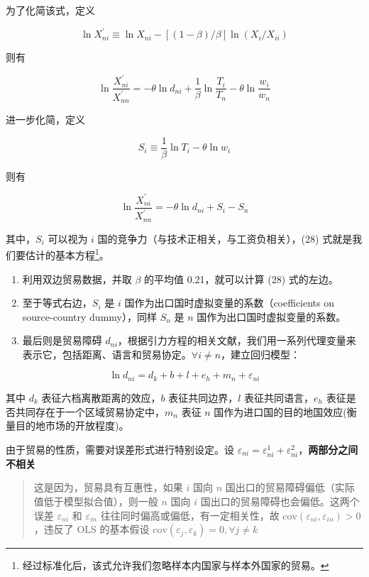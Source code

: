 \documentclass[
]{article}
\providecommand{\tightlist}{%
  \setlength{\itemsep}{0pt}\setlength{\parskip}{0pt}}
\begin{document}
为了化简该式，定义

\[\ln X_{n i}^{\prime} \equiv \ln X_{ni}-[(1-\beta)/\beta] \ln (X_i/X_{ii})\]

则有

\[
\ln \frac{X_{n i}^{\prime}}{X_{n n}^{\prime}}=-\theta \ln d_{n i}+\frac{1}{\beta} \ln \frac{T_{i}}{T_{n}}-\theta \ln \frac{w_{i}}{w_{n}} \tag{26}
\]

进一步化简，定义

\[
S_i \equiv \frac{1}{\beta} \ln T_i - \theta \ln w_i \tag{27}
\]

则有

\[
\ln \frac{X_{n i}^{\prime}}{X_{n n}^{\prime}}=-\theta \ln d_{n i}+S_i-S_n \tag{28}
\]

其中，\(S_i\) 可以视为 \(i\) 国的竞争力（与技术正相关，与工资负相关），(28) 式就是我们要估计的基本方程\footnote{经过标准化后，该式允许我们忽略样本内国家与样本外国家的贸易。}。

\begin{enumerate}
\def\labelenumi{\arabic{enumi}.}
\tightlist
\item
  利用双边贸易数据，并取 \(\beta\) 的平均值 0.21，就可以计算 (28) 式的左边。
\item
  至于等式右边，\(S_i\) 是 \(i\) 国作为出口国时虚拟变量的系数（coefficients on source-country dummy），同样 \(S_n\) 是 \(n\) 国作为出口国时虚拟变量的系数。
\item
  最后则是贸易障碍 \(d_{ni}\)，根据引力方程的相关文献，我们用一系列代理变量来表示它，包括距离、语言和贸易协定。\(\forall i \neq n\)，建立回归模型：
\end{enumerate}

\[
\ln d_{n i}=d_{k}+b+l+e_{h}+m_{n}+\varepsilon_{n i} \tag{29}
\]

其中 \(d_k\) 表征六档离散距离的效应，\(b\) 表征共同边界，\(l\) 表征共同语言，\(e_h\)
表征是否共同存在于一个区域贸易协定中，\(m_n\)
表征 \(n\) 国作为进口国的目的地国效应(衡量目的地市场的开放程度)。

由于贸易的性质，需要对误差形式进行特别设定。设 \(\varepsilon_{ni}=\varepsilon_{ni}^1+\varepsilon_{ni}^2\)，\textbf{两部分之间不相关}

\begin{quote}
这是因为，贸易具有互惠性，如果 \(i\) 国向 \(n\) 国出口的贸易障碍偏低（实际值低于模型拟合值），则一般 \(n\) 国向 \(i\) 国出口的贸易障碍也会偏低。这两个误差 \(\varepsilon_{ni}\) 和 \(\varepsilon_{in}\) 往往同时偏高或偏低，有一定相关性，故 \(\text{cov}(\varepsilon_{ni}, \varepsilon_{in})>0\)，违反了 OLS 的基本假设 \(\text{cov}(\varepsilon_j, \varepsilon_k)= 0, \forall j \neq k\)
\end{quote}
\end{document}
